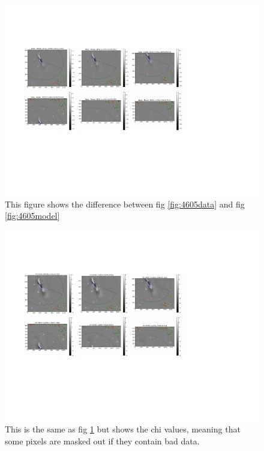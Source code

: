 \documentclass[12pt,preprint,pdftex]{aastex}
\begin{document}
\begin{figure}
\centering
\includegraphics[trim = 1cm 3.2cm 3.8cm 2.15cm,clip=true,width=\textwidth] {diff.pdf}
\caption{This figure shows the difference between fig \ref{fig:4605data} and fig \ref{fig:4605model}}
\label{fig:4605diff}
\end{figure}
\begin{figure}
\centering
\includegraphics[trim = 1cm 3.2cm 3.8cm 2.15cm,clip=true,width=\textwidth] {chi.pdf}
\caption{This is the same as fig \ref{fig:4605diff} but shows the chi values, meaning that some pixels are masked out if they contain bad data.}
\label{fig:4605chi}
\end{figure}
\end{document}

